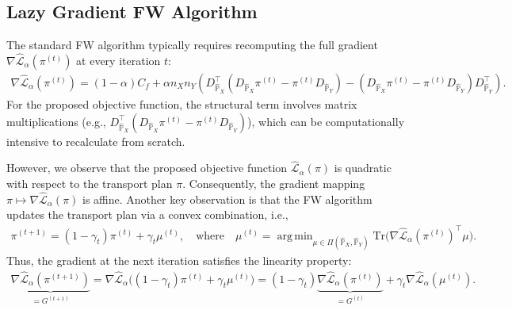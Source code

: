\documentclass{article}
\theoremstyle{plain}
\theoremstyle{definition}
\theoremstyle{remark}
\DeclareMathOperator*{\argmin}{arg\,min}
\begin{document}
\subsection{Lazy Gradient FW Algorithm}
The standard FW algorithm typically requires recomputing the full gradient $\nabla \hat{\mathcal{L}}_{\alpha}(\pi^{(t)})$ at every iteration $t$:
\begin{align*}
	\nabla \hat{\mathcal{L}}_{\alpha}(\pi^{(t)}) = (1 - \alpha) C_f + \alpha n_Xn_Y \left(D_{\hat{\mathbb{P}}_X}^{\top}(D_{\hat{\mathbb{P}}_X}\pi^{(t)} - \pi^{(t)}D_{\hat{\mathbb{P}}_Y}) - (D_{\hat{\mathbb{P}}_X}\pi^{(t)} - \pi^{(t)}D_{\hat{\mathbb{P}}_Y})D_{\hat{\mathbb{P}}_Y}^{\top}\right) .
\end{align*}
For the proposed objective function, the structural term involves matrix multiplications (e.g., $D_{\hat{\mathbb{P}}_X}^\top (D_{\hat{\mathbb{P}}_X} \pi^{(t)} - \pi^{(t)} D_{\hat{\mathbb{P}}_Y})$), which can be computationally intensive to recalculate from scratch.

However, we observe that the proposed objective function $\hat{\mathcal{L}}_{\alpha}(\pi)$ is quadratic with respect to the transport plan $\pi$. Consequently, the gradient mapping $\pi \mapsto \nabla \hat{\mathcal{L}}_{\alpha}(\pi)$ is affine. Another key observation is that the FW algorithm updates the transport plan via a convex combination, i.e.,
\begin{align*}
	\pi^{(t+1)} = (1-\gamma_t)\pi^{(t)} + \gamma_t \mu^{(t)} , \quad \text{where} \quad \mu^{(t)} = \argmin_{\mu \in \Pi(\hat{\mathbb{P}}_X,\hat{\mathbb{P}}_Y)} \mathrm{Tr}\Big(\nabla \hat{\mathcal{L}}_{\alpha}(\pi^{(t)})^{\top}\mu\Big) .
\end{align*}
Thus, the gradient at the next iteration satisfies the linearity property:
\begin{align*}
	\underbrace{\nabla \hat{\mathcal{L}}_{\alpha}(\pi^{(t+1)})}_{= G^{(t+1)}} = \nabla \hat{\mathcal{L}}_{\alpha}\big((1-\gamma_t)\pi^{(t)} + \gamma_t \mu^{(t)}\big) = (1-\gamma_t)\underbrace{\nabla \hat{\mathcal{L}}_{\alpha}(\pi^{(t)})}_{= G^{(t)}} + \gamma_t \nabla \hat{\mathcal{L}}_{\alpha}(\mu^{(t)}) .
\end{align*}
\end{document}
